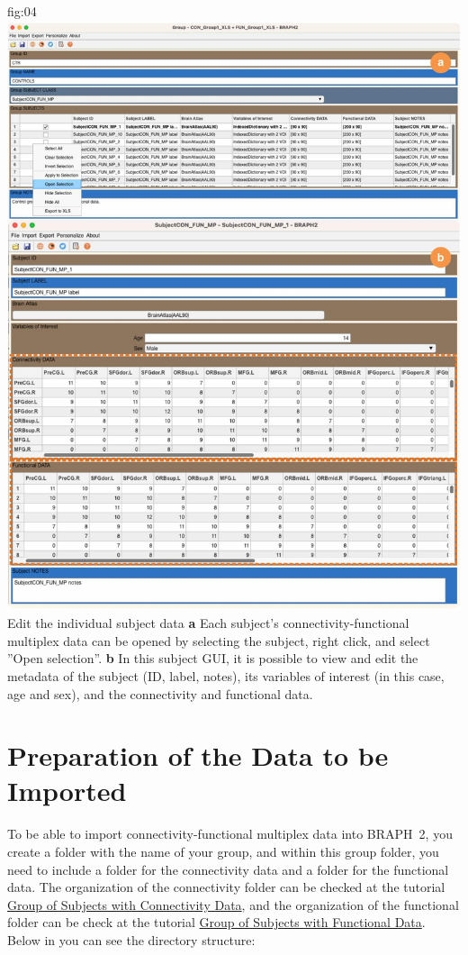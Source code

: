 \documentclass[justified]{tufte-handout}
\begin{document}
	{fig:04}
	{\includegraphics{fig04.jpg}
	}
	{Edit the individual subject data}
	{
	{\bf a}  Each subject's connectivity-functional multiplex data can be opened by selecting the subject, right click, and select ''Open selection''. 
	{\bf b} In this subject GUI, it is possible to view and edit the metadata of the subject (ID, label, notes), its variables of interest (in this case, age and sex), and the connectivity and functional data. 
	}


\clearpage
\section{Preparation of the Data to be Imported}

To be able to import connectivity-functional multiplex data into BRAPH~2, you create a folder with the name of your group, and within this group folder, you need to include a folder for the connectivity data and a folder for the functional data. The organization of the connectivity folder can be checked at the tutorial \href{https://github.com/braph-software/BRAPH-2/tree/develop/tutorials/general/tut_gr_con}{Group of Subjects with Connectivity Data}, and the organization of the functional folder can be check at the tutorial \href{https://github.com/braph-software/BRAPH-2/tree/develop/tutorials/general/tut_gr_fun}{Group of Subjects with Functional Data}. Below in  you can see the directory structure:
\end{document}
